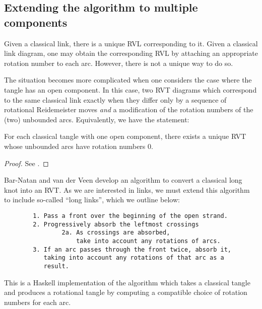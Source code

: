 \subsection{Extending the algorithm to multiple components}

Given a classical link, there is a unique \ac{RVL} corresponding to it. Given a
classical link diagram, one may obtain the corresponding \ac{RVL} by attaching
an appropriate rotation number to each arc. However, there is not a unique way
to do so.

The situation becomes more complicated when one considers the case where the
tangle has an open component. In this case, two \ac{RVT} diagrams which
correspond to the same classical link exactly when they differ only by a
sequence of rotational Reidemeister moves \emph{and} a modification of the
rotation numbers of the (two) unbounded arcs. Equivalently, we have the
statement:

\begin{lemma}
        For each classical tangle with one open component, there exists a unique
        \ac{RVT} whose unbounded arcs have rotation numbers $0$.
\end{lemma}
\begin{proof}
        See \cite{BV}.
\end{proof}

Bar-Natan and van der Veen develop an algorithm to convert a classical long knot
into an \ac{RVT}. As we are interested in links, we must extend this algorithm
to include so-called \enquote{long links}, which we outline below:
\begin{verbatim}
        1. Pass a front over the beginning of the open strand.
        2. Progressively absorb the leftmost crossings
                2a. As crossings are absorbed,
                    take into account any rotations of arcs.
        3. If an arc passes through the front twice, absorb it,
           taking into account any rotations of that arc as a
           result.
\end{verbatim}



This is a Haskell implementation of the algorithm  which takes a
classical tangle and produces a rotational tangle by computing a compatible
choice of rotation numbers for each arc.


